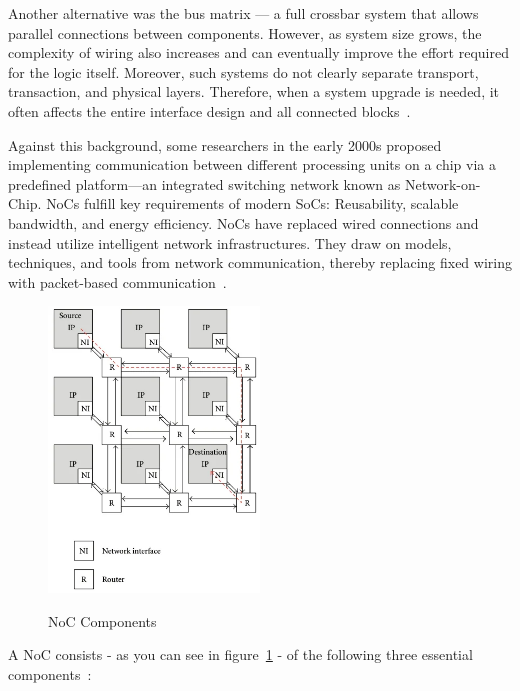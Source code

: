 Another alternative was the bus matrix — a full crossbar system that allows parallel connections between components. However, as system size grows, the complexity of wiring also increases and can eventually improve the effort required for the logic itself. Moreover, such systems do not clearly separate transport, transaction, and physical layers. Therefore, when a system upgrade is needed, it often affects the entire interface design and all connected blocks~\cite{unnikrishnan_network_2021}.

Against this background, some researchers in the early 2000s proposed implementing communication between different processing units on a chip via a predefined platform—an integrated switching network known as Network-on-Chip. \acp{NoC} fulfill key requirements of modern \ac{SoC}s: Reusability, scalable bandwidth, and energy efficiency. \acp{NoC} have replaced wired connections and instead utilize intelligent network infrastructures. They draw on models, techniques, and tools from network communication, thereby replacing fixed wiring with packet-based communication~\cite{unnikrishnan_network_2021}.

\begin{figure}[h!]
    \centering
    \includegraphics[width=0.5\textwidth]{paper/img/NoC-Components.png}
    \caption{NoC Components}
    \cite{hertz_why_2025}
    \label{fig:noc_components}
\end{figure}

A \acs{NoC} consists - as you can see in figure~\ref{fig:noc_components} - of the following three essential components~\cite{yu_flexible_2010, unnikrishnan_network_2021}:

